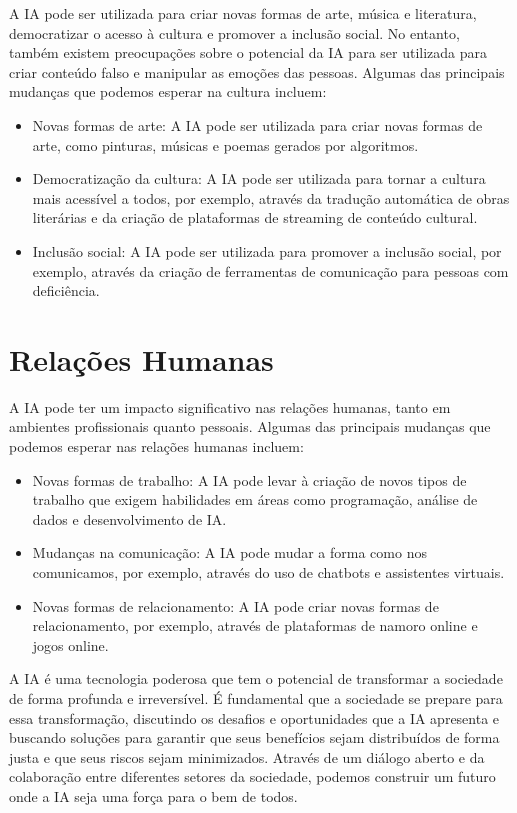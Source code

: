 \documentclass[12pt,twoside]{book}
\begin{document}
A IA pode ser utilizada para criar novas formas de arte, música e literatura, democratizar o acesso à cultura e promover a inclusão social. No entanto, também existem preocupações sobre o potencial da IA para ser utilizada para criar conteúdo falso e manipular as emoções das pessoas. Algumas das principais mudanças que podemos esperar na cultura incluem:
\begin{itemize}
    \item Novas formas de arte: A IA pode ser utilizada para criar novas formas de arte, como pinturas, músicas e poemas gerados por algoritmos.
    \item Democratização da cultura: A IA pode ser utilizada para tornar a cultura mais acessível a todos, por exemplo, através da tradução automática de obras literárias e da criação de plataformas de streaming de conteúdo cultural.
    \item Inclusão social: A IA pode ser utilizada para promover a inclusão social, por exemplo, através da criação de ferramentas de comunicação para pessoas com deficiência.
\end{itemize}

\section{Relações Humanas}

A IA pode ter um impacto significativo nas relações humanas, tanto em ambientes profissionais quanto pessoais. Algumas das principais mudanças que podemos esperar nas relações humanas incluem:
\begin{itemize}
    \item Novas formas de trabalho: A IA pode levar à criação de novos tipos de trabalho que exigem habilidades em áreas como programação, análise de dados e desenvolvimento de IA.
    \item Mudanças na comunicação: A IA pode mudar a forma como nos comunicamos, por exemplo, através do uso de chatbots e assistentes virtuais.
    \item Novas formas de relacionamento: A IA pode criar novas formas de relacionamento, por exemplo, através de plataformas de namoro online e jogos online.
\end{itemize}

A IA é uma tecnologia poderosa que tem o potencial de transformar a sociedade de forma profunda e irreversível. É fundamental que a sociedade se prepare para essa transformação, discutindo os desafios e oportunidades que a IA apresenta e buscando soluções para garantir que seus benefícios sejam distribuídos de forma justa e que seus riscos sejam minimizados. Através de um diálogo aberto e da colaboração entre diferentes setores da sociedade, podemos construir um futuro onde a IA seja uma força para o bem de todos.
\end{document}
